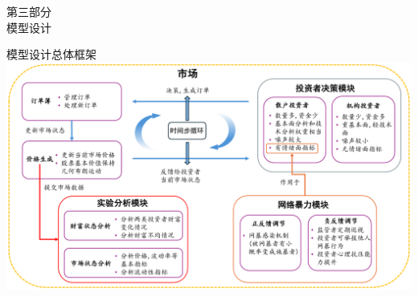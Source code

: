 \begin{frame}
    \begin{center}
        \textcolor{NJU_purple}{\Large 第三部分} \\[1.5em]
        \textcolor{NJU_purple}{\Huge 模型设计}
    \end{center}
\end{frame}

\begin{frame}{模型设计总体框架}
    \centering
    \includegraphics[width=1.0\textwidth]{pic/3-1_structure.pdf}  %
    \end{frame}


